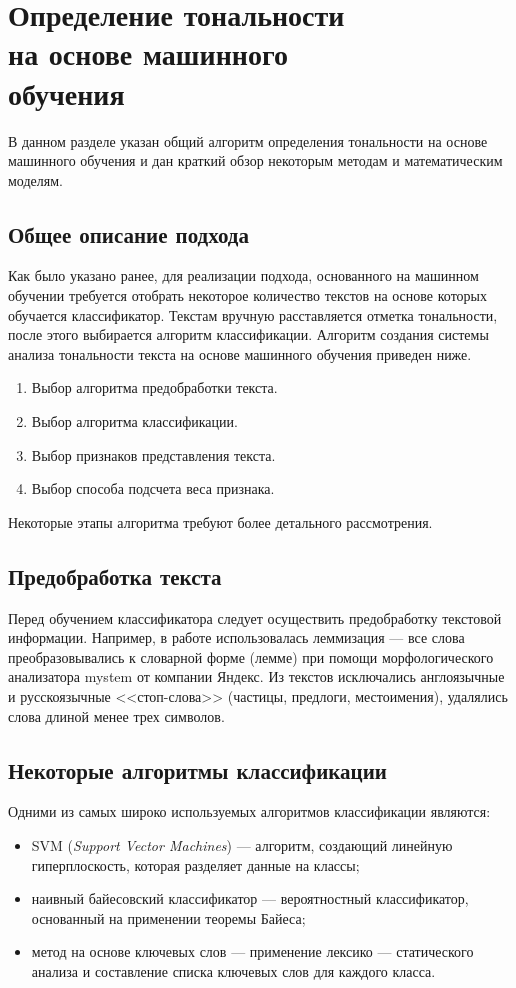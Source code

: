 \chapter[Определение тональности на основе машинного обучения]{Определение тональности\\на основе машинного\\обучения}
В данном разделе указан общий алгоритм определения тональности на основе машинного обучения и дан краткий обзор некоторым методам и математическим моделям.
\section{Общее описание подхода}
Как было указано ранее, для реализации подхода, основанного на машинном обучении требуется отобрать некоторое количество текстов на основе которых обучается классификатор. Текстам вручную расставляется отметка тональности, после этого выбирается алгоритм классификации. 
Алгоритм создания системы анализа тональности текста на основе машинного обучения приведен ниже.
\begin{enumerate}
	\item Выбор алгоритма предобработки текста.
	\item Выбор алгоритма классификации.
	\item Выбор признаков представления текста.
	\item Выбор способа подсчета веса признака.
\end{enumerate}

Некоторые этапы алгоритма требуют более детального рассмотрения. 
\section{Предобработка текста}
Перед обучением классификатора следует осуществить предобработку текстовой информации. Например, в работе \cite{prepr} использовалась леммизация --- все слова преобразовывались к словарной форме (лемме) при помощи морфологического анализатора mystem\cite{mystem} от компании Яндекс. Из текстов исключались англоязычные и русскоязычные <<стоп-слова>> (частицы, предлоги, местоимения), удалялись слова длиной менее трех
символов.
\section{Некоторые алгоритмы классификации}
Одними из самых широко используемых алгоритмов классификации являются:
\begin{itemize}
	\item SVM (\textit{Support Vector Machines}) --- алгоритм, создающий линейную гиперплоскость, которая разделяет данные на классы;
	\item наивный байесовский классификатор --- вероятностный классификатор, основанный на применении теоремы Байеса;
	\item метод на основе ключевых слов --- применение лексико --- статического анализа и составление списка ключевых слов для каждого класса. 
\end{itemize}

